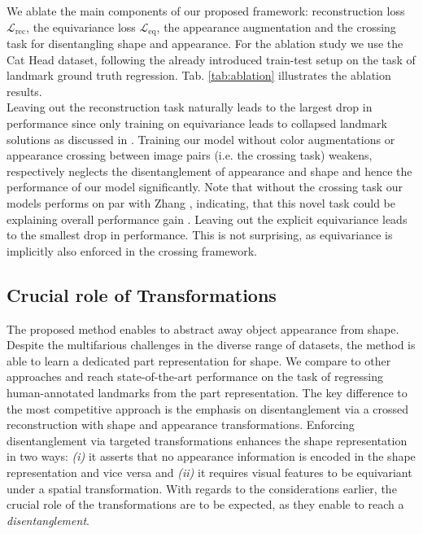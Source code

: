 		We ablate the main components of our proposed framework: reconstruction loss $\mathcal{L}_{\textrm{rec}}$, the equivariance loss $\mathcal{L}_{\textrm{eq}}$, the appearance augmentation and the crossing task for disentangling shape and appearance. For the ablation study we use the Cat Head dataset, following the already introduced train-test setup on the task of landmark ground truth regression. Tab. \ref{tab:ablation} illustrates the ablation results.\\
		Leaving out the reconstruction task naturally leads to the largest drop in performance since only training on equivariance leads to collapsed landmark solutions as discussed in \cite{zhang18}.
		Training our model without color augmentations or appearance crossing between image pairs (i.e. the crossing task) weakens, respectively neglects the disentanglement of appearance and shape and hence the performance of our model significantly. %
		Note that without the crossing task our models performs on par with Zhang \etal \cite{zhang18}, indicating, that this novel task could be explaining overall performance gain \wrt \cite{zhang18}. %
		Leaving out the explicit equivariance leads to the smallest drop in performance. This is not surprising, as equivariance is implicitly also enforced in the crossing framework.

	\subsection{Crucial role of Transformations}
		The proposed method enables to abstract away object appearance from shape.
		Despite the multifarious challenges in the diverse range of datasets, the method is able to learn a dedicated part representation for shape.
		We compare to other approaches and reach state-of-the-art performance on the task of regressing human-annotated landmarks from the part representation.
		The key difference to the most competitive approach \cite{zhang18} is the emphasis on disentanglement via a crossed reconstruction with shape and appearance transformations.
		Enforcing disentanglement via targeted transformations enhances the shape representation in two ways: \emph{(i)} it asserts that no appearance information is encoded in the shape representation and vice versa and \emph{(ii)} it requires visual features to be equivariant under a spatial transformation.
		With regards to the considerations earlier, the crucial role of the transformations are to be expected, as they enable to reach a \textit{disentanglement}.
